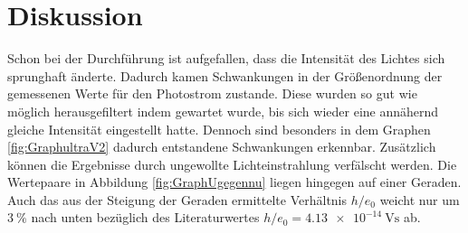 
\section{Diskussion}
\label{sec:Diskussion}

Schon bei der Durchführung ist aufgefallen, dass die Intensität des Lichtes sich
 sprunghaft änderte. Dadurch kamen Schwankungen in der Größenordnung der gemessenen
  Werte für den Photostrom zustande. Diese wurden so gut wie möglich herausgefiltert
   indem gewartet wurde, bis sich wieder eine annähernd gleiche Intensität eingestellt
   hatte. Dennoch sind besonders in dem Graphen \ref{fig:GraphultraV2} dadurch
   entstandene Schwankungen erkennbar. Zusätzlich können die Ergebnisse durch
   ungewollte Lichteinstrahlung verfälscht werden. Die Wertepaare in Abbildung
   \ref{fig:GraphUgegennu} liegen hingegen auf einer Geraden. Auch das aus
   der Steigung der Geraden ermittelte Verhältnis $h/e_0$ weicht nur um
   $\SI{3}{\percent}$ nach unten bezüglich des Literaturwertes
   $h/e_0=\SI{4.13e-14}{\volt\second}$ \cite{nistgov} ab.
